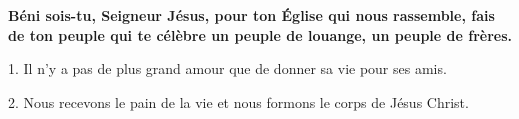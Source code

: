\textbf{
Béni sois-tu, Seigneur Jésus,
pour ton Église qui nous rassemble,
fais de ton peuple qui te célèbre
un peuple de louange,
un peuple de frères.
}

1.
Il n’y a pas de plus grand amour
que de donner sa vie pour ses amis.

2.
Nous recevons le pain de la vie
et nous formons le corps de Jésus Christ.
%
%
